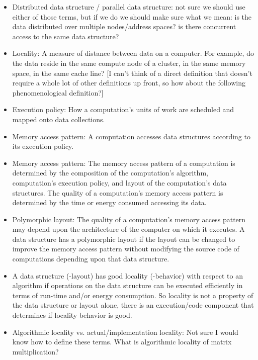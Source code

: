\begin{itemize}
\begin{itemize}
\begin{itemize}
 
  \item Distributed data structure / parallel data structure: not sure we should use either of those terms, but if we do we should make sure what we mean: is the data distributed over multiple nodes/address spaces? is there concurrent access to the same data structure? 
      
  \item {} Locality: A measure of distance between data on a computer.  For example, do the data reside in the same compute node of a cluster, in the same memory space, in the same cache line?  [I can't think of a direct definition that doesn't require a whole lot of other definitions up front, so how about the following phenomenological definition?]

  \item Execution policy: How a computation's units of work are scheduled and mapped onto data collections. 

  \item Memory access pattern: A computation accesses data structures according to its execution policy. 

  \item Memory access pattern: The memory access pattern of a computation is determined by the composition of the computation's algorithm, computation's execution policy, and layout of the computation's data structures.  The quality of a computation's memory access pattern is determined by the time or energy consumed accessing its data.  

  \item Polymorphic layout: The quality of a computation's memory access pattern may depend upon the architecture of the computer on which it executes.  A data structure has a polymorphic layout if the layout can be changed to improve the memory access pattern without modifying the source code of computations depending upon that data structure.

  \item A data structure (-layout) has good locality (-behavior) with respect to an algorithm if operations on the data structure can be executed efficiently in terms of run-time and/or energy consumption. So locality is not a property of the data structure or layout alone, there is an execution/code component that determines if locality behavior is good.

  \item Algorithmic locality vs. actual/implementation locality: Not sure I would know how to define these terms. What is algorithmic locality of matrix multiplication? 


\end{itemize}
\end{itemize}
\end{itemize}
